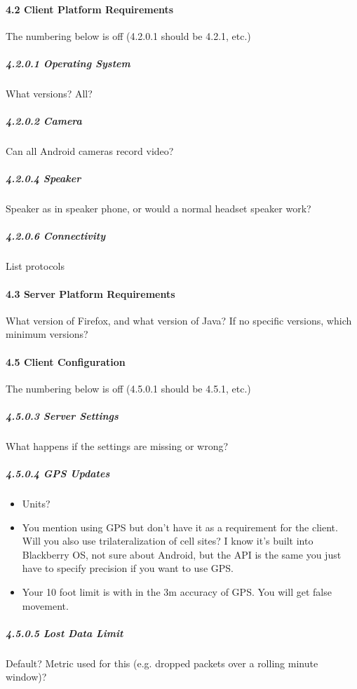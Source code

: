 \documentclass{article}
\begin{document}
\paragraph{4.2 Client Platform Requirements}
    The numbering below is off (4.2.0.1 should be 4.2.1, etc.)
\subparagraph{4.2.0.1  Operating System}
    What versions?  All?
\subparagraph{4.2.0.2  Camera}
    Can all Android cameras record video?
\subparagraph{4.2.0.4  Speaker}
    Speaker as in speaker phone, or would a normal headset speaker work?
\subparagraph{4.2.0.6  Connectivity}
    List protocols


\paragraph{4.3  Server Platform Requirements}
    What version of Firefox, and what version of Java?  If no specific
    versions, which minimum versions?


\paragraph{4.5  Client Configuration}
    The numbering below is off (4.5.0.1 should be 4.5.1, etc.)
\subparagraph{4.5.0.3  Server Settings}
    What happens if the settings are missing or wrong?
\subparagraph{4.5.0.4  GPS Updates}
    \begin{itemize}
        \item Units?
        \item You mention using GPS but don't have it as a requirement for the
        client. Will you also use trilateralization of cell sites? I know it's
        built into Blackberry OS, not sure about Android, but the API is the
        same you just have to specify precision if you want to use GPS.
        \item Your 10 foot limit is with in the 3m accuracy of GPS. You will
        get false movement.
    \end{itemize}
\subparagraph{4.5.0.5  Lost Data Limit}
    Default?  Metric used for this (e.g. dropped packets over a rolling minute
    window)?

\end{document}
